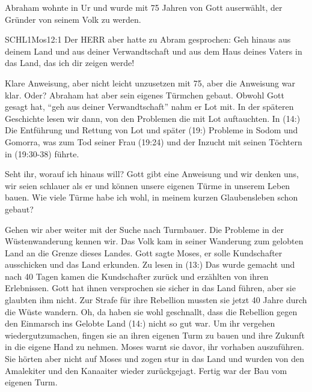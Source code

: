 \documentclass[14pt]{../../inc/mybib}
\newenvironment{block}[1][]{%
  \vspace{1.5em}%
  \noindent\textbf{#1}\par%
  \vspace{0.0em}%
}{%
  \vspace{1em}%
}
\begin{document}
\begin{block}
    Abraham wohnte in Ur und wurde mit 75 Jahren von Gott auserwählt, der Gründer von seinem Volk zu werden. 
    \begin{bibelbox}{SCHL}{1Mos}{12:1}
        Der HERR aber hatte zu Abram gesprochen: Geh hinaus aus deinem Land und aus deiner Verwandtschaft und aus dem Haus deines Vaters in das Land, das ich dir zeigen werde!
    \end{bibelbox} 

    Klare Anweisung, aber nicht leicht unzusetzen mit 75, aber die Anweisung war klar. Oder? Abraham hat aber sein eigenes Türmchen gebaut. Obwohl Gott gesagt hat, \enquote{geh aus deiner Verwandtschaft} nahm er Lot mit. In der späteren Geschichte lesen wir dann, von den Problemen die mit Lot auftauchten. In (14:) Die Entführung und Rettung von Lot und später (19:) Probleme in Sodom und Gomorra, was zum Tod seiner Frau (19:24) und der Inzucht mit seinen Töchtern in (19:30-38) führte.
\end{block}
\begin{block}
    Seht ihr, worauf ich hinaus will? Gott gibt eine Anweisung und wir denken uns, wir seien schlauer als er und können unsere eigenen Türme in unserem Leben bauen. Wie viele Türme habe ich wohl, in meinem kurzen Glaubensleben schon gebaut?
\end{block}
\begin{block}
    Gehen wir aber weiter mit der Suche nach Turmbauer. Die Probleme in der Wüstenwanderung kennen wir. Das Volk kam in seiner Wanderung zum gelobten Land an die Grenze dieses Landes. Gott sagte Moses, er solle Kundschafter ausschicken und das Land erkunden. Zu lesen in (13:) Das wurde gemacht und nach 40 Tagen kamen die Kundschafter zurück und erzählten von ihren Erlebnissen. Gott hat ihnen versprochen sie sicher in das Land führen, aber sie glaubten ihm nicht. Zur Strafe für ihre Rebellion mussten sie jetzt 40 Jahre durch die Wüste wandern. Oh, da haben sie wohl geschnallt, dass die Rebellion gegen den Einmarsch ins Gelobte Land (14:) nicht so gut war. Um ihr vergehen wiedergutzumachen, fingen sie an ihren eigenen Turm zu bauen und ihre Zukunft in die eigene Hand zu nehmen. Moses warnt sie davor, ihr vorhaben auszuführen. Sie hörten aber nicht auf Moses und zogen stur in das Land und wurden von den Amalekiter und den Kanaaiter wieder zurückgejagt. Fertig war der Bau vom eigenen Turm.
\end{block}
\end{document}
